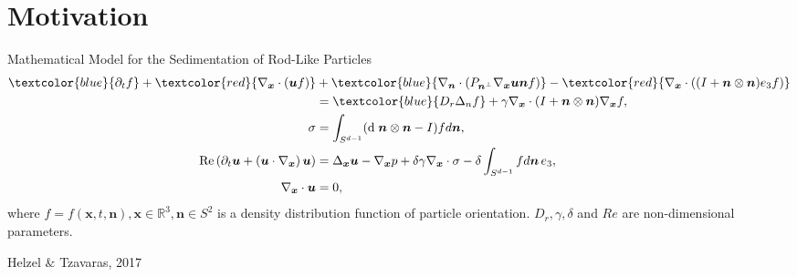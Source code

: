 \section{Motivation}
\begin{frame}{Mathematical Model for the Sedimentation of Rod-Like Particles}
	\scriptsize
{}
\begin{align*}
	\textcolor{blue}{\partial_t f}+ \textcolor{red}{\nabla_{\boldsymbol{x}} \cdot(\boldsymbol{u} f)} & +\textcolor{blue}{\nabla_{\boldsymbol{n}} \cdot\left(P_{\boldsymbol{n}^{\perp}} \nabla_{\boldsymbol{x}} \boldsymbol{u} \boldsymbol{n} f\right)}- \textcolor{red}{\nabla_{\boldsymbol{x}} \cdot\left((I+\boldsymbol{n} \otimes \boldsymbol{n}) e_3 f\right)} \\
	& =\textcolor{blue}{D_r \Delta_n f}+\gamma \nabla_{\boldsymbol{x}} \notag \cdot(I+\boldsymbol{n} \otimes \boldsymbol{n}) \nabla_{\boldsymbol{x}} f, \\
	\sigma & =\int_{S^{d-1}}(\text{d} \; \boldsymbol{n} \otimes \boldsymbol{n}-I) f d \boldsymbol{n},  \\
	\operatorname{Re}\left(\partial_t \boldsymbol{u}+\left(\boldsymbol{u} \cdot \nabla_{\boldsymbol{x}}\right) \boldsymbol{u}\right) & =\Delta_{\boldsymbol{x}} \boldsymbol{u}-\nabla_{\boldsymbol{x}} p+\delta \gamma \nabla_{\boldsymbol{x}} \cdot \sigma-\delta \int_{S^{d-1}} f d \boldsymbol{n} \, e_3, \\
	\nabla_{\boldsymbol{x}} \cdot \boldsymbol{u} & =0,
\end{align*}
where $f = f(\boldsymbol{x}, t, \boldsymbol{n}), \boldsymbol{x} \in \mathbb{R}^3 , \boldsymbol{n} \in  S^2$ is a density distribution function of particle orientation. $D_r, \gamma, \delta$ and $Re$ are non-dimensional parameters.
\begin{beamercolorbox}[sep=1em,wd=\linewidth,right]{}
	\tiny{Helzel $\&$ Tzavaras, 2017}
\end{beamercolorbox}
\end{frame}



